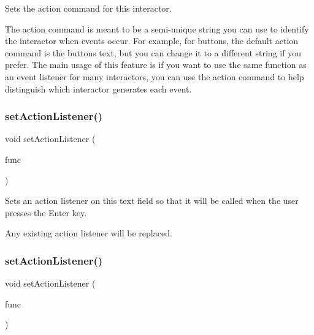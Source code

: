 Sets the action command for this interactor. 

The action command is meant to be a semi-\/unique string you can use to identify the interactor when events occur. For example, for buttons, the default action command is the button\textquotesingle{}s text, but you can change it to a different string if you prefer. The main usage of this feature is if you want to use the same function as an event listener for many interactors, you can use the action command to help distinguish which interactor generates each event. \mbox{\label{classGTextField_adcfb4742430c88714fcf57e57ab8ea9c}} 
\subsubsection{\texorpdfstring{set\+Action\+Listener()}{setActionListener()}\hspace{0.1cm}{\footnotesize\ttfamily [1/2]}}
{\footnotesize\ttfamily void set\+Action\+Listener (\begin{DoxyParamCaption}\item[{G\+Event\+Listener}]{func }\end{DoxyParamCaption})\hspace{0.3cm}{\ttfamily [virtual]}}



Sets an action listener on this text field so that it will be called when the user presses the Enter key. 

Any existing action listener will be replaced. \mbox{\label{classGTextField_aebd20a89c7a8a43a6fce999cf4f9fcf2}} 
\subsubsection{\texorpdfstring{set\+Action\+Listener()}{setActionListener()}\hspace{0.1cm}{\footnotesize\ttfamily [2/2]}}
{\footnotesize\ttfamily void set\+Action\+Listener (\begin{DoxyParamCaption}\item[{G\+Event\+Listener\+Void}]{func }\end{DoxyParamCaption})\hspace{0.3cm}{\ttfamily [virtual]}}



